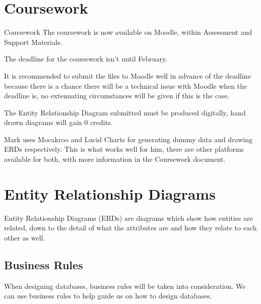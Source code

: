 
\section*{Coursework}
\begin{link}{Coursework}
    The coursework is now available on Moodle, within Assessment and Support Materials.
\end{link}
The deadline for the coursework isn't until February.

It is recommended to submit the files to Moodle well in advance of the deadline because there is a chance there will be a technical issue with Moodle when the deadline is, no extenuating circumstances will be given if this is the case.

The Entity Relationship Diagram submitted must be produced digitally, hand drawn diagrams will gain 0 credits.

Mark uses Mocakroo and Lucid Charts for generating dummy data and drawing ERDs respectively. This is what works well for him, there are other platforms available for both, with more information in the Coursework document.

\section*{Entity Relationship Diagrams}
Entity Relationship Diagrams (ERDs) are diagrams which show how entities are related, down to the detail of what the attributes are and how they relate to each other as well. 

\subsection*{Business Rules}
When designing databases, business rules will be taken into consideration.
We can use business rules to help guide us on how to design databases.

